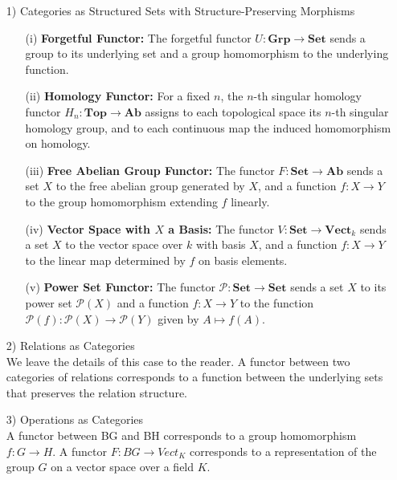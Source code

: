 \documentclass[11pt]{article}
\theoremstyle{definition}
\theoremstyle{plain}
\begin{document}
\begin{itemize}
    \item [1)]Categories as Structured Sets with Structure-Preserving Morphisms
          \begin{itemize}
              \item[(i)] \textbf{Forgetful Functor:} The forgetful functor $U : \mathbf{Grp} \to \mathbf{Set}$ sends a group to its underlying set and a group homomorphism to the underlying function.
              \item[(ii)] \textbf{Homology Functor:} For a fixed $n$, the $n$-th singular homology functor $H_n : \mathbf{Top} \to \mathbf{Ab}$ assigns to each topological space its $n$-th singular homology group, and to each continuous map the induced homomorphism on homology.
              \item[(iii)] \textbf{Free Abelian Group Functor:} The functor $F : \mathbf{Set} \to \mathbf{Ab}$ sends a set $X$ to the free abelian group generated by $X$, and a function $f : X \to Y$ to the group homomorphism extending $f$ linearly.
              \item[(iv)] \textbf{Vector Space with $X$ a Basis:} The functor $V : \mathbf{Set} \to \mathbf{Vect}_k$ sends a set $X$ to the vector space over $k$ with basis $X$, and a function $f : X \to Y$ to the linear map determined by $f$ on basis elements.
              \item[(v)] \textbf{Power Set Functor:} The functor $\mathcal{P} : \mathbf{Set} \to \mathbf{Set}$ sends a set $X$ to its power set $\mathcal{P}(X)$ and a function $f : X \to Y$ to the function $\mathcal{P}(f) : \mathcal{P}(X) \to \mathcal{P}(Y)$ given by $A \mapsto f(A)$.
          \end{itemize}
    \item [2)]Relations as Categories \\
          We leave the details of this case to the reader. A functor between two categories of relations corresponds to a function between the underlying sets that preserves the relation structure.
    \item [3)]Operations as Categories \\
          A functor between BG and BH corresponds to  a group homomorphism $f : G \to H$. A functor $F : BG \to Vect_K$ corresponds to a representation of the group $G$ on a vector space over a field $K$.



\end{itemize}
\end{document}
